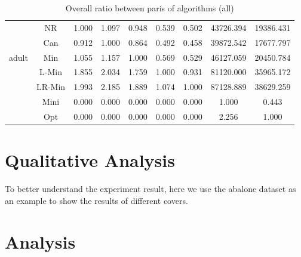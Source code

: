 \documentclass[11pt]{book}
\begin{document}
\begin{table}
\begin{tabular}{|c|c|c|c|c|c|c|c|c|}
    \hline
    \multirow{5}{*}{adult}
         & NR & 1.000 & 1.097 & 0.948 & 0.539 & 0.502 & 43726.394 & 19386.431 \\                                                                                                                                     
         & Can & 0.912 & 1.000 & 0.864 & 0.492 & 0.458 & 39872.542 & 17677.797 \\                                                                                                                                    
         & Min & 1.055 & 1.157 & 1.000 & 0.569 & 0.529 & 46127.059 & 20450.784 \\                                                                                                                                    
         & L-Min & 1.855 & 2.034 & 1.759 & 1.000 & 0.931 & 81120.000 & 35965.172 \\                                                                                                                                  
         & LR-Min & 1.993 & 2.185 & 1.889 & 1.074 & 1.000 & 87128.889 & 38629.259 \\                                                                                                                                 
         & Mini & 0.000 & 0.000 & 0.000 & 0.000 & 0.000 & 1.000 & 0.443 \\                                                                                                                                           
         & Opt & 0.000 & 0.000 & 0.000 & 0.000 & 0.000 & 2.256 & 1.000 \\
    	
    \hline

    
\end{tabular}

	\caption{Overall ratio between paris of algorithms (all)}

\end{table}

\section{Qualitative Analysis}

To better understand the experiment result, here we use the abalone dataset as an example to show the results of different covers.

\section{Analysis}
\end{document}
